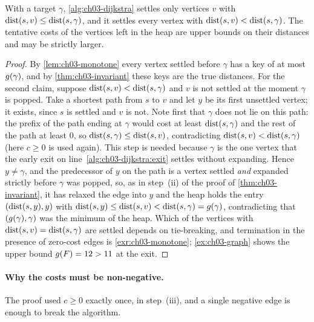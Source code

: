 \begin{corollary}
\label{cor:ch03-ucs}
%
With a target $\gamma$, \cref{alg:ch03-dijkstra} settles only vertices $v$ with
$\operatorname{dist}(s,v)\le\operatorname{dist}(s,\gamma)$, and it settles every vertex with $\operatorname{dist}(s,v)<\operatorname{dist}(s,\gamma)$. The
tentative costs of the vertices left in the heap are upper bounds on their distances and may be
strictly larger.
\end{corollary}
\begin{proof}
By \cref{lem:ch03-monotone} every vertex settled before $\gamma$ has a key of at most $g(\gamma)$,
and by \cref{thm:ch03-invariant} these keys are the true distances. For the second claim,
suppose $\operatorname{dist}(s,v)<\operatorname{dist}(s,\gamma)$ and $v$ is not settled at the moment $\gamma$ is popped. Take a
shortest path from $s$ to $v$ and let $y$ be its first unsettled vertex; it exists, since $s$ is
settled and $v$ is not. Note first that $\gamma$ does not lie on this path: the prefix of the path
ending at $\gamma$ would cost at least $\operatorname{dist}(s,\gamma)$ and the rest of the path at least $0$, so
$\operatorname{dist}(s,\gamma)\le\operatorname{dist}(s,v)$, contradicting $\operatorname{dist}(s,v)<\operatorname{dist}(s,\gamma)$ (here $c\ge0$ is used
again). This step is needed because $\gamma$ is the one vertex that the early exit on
line~\ref{alg:ch03-dijkstra:exit} settles without expanding. Hence $y\neq \gamma$, and the
predecessor of $y$ on the path is a vertex settled \emph{and} expanded strictly before $\gamma$ was
popped, so, as in step~(ii) of the proof of \cref{thm:ch03-invariant}, it has relaxed the edge
into $y$ and the heap holds the entry $(\operatorname{dist}(s,y),y)$ with $\operatorname{dist}(s,y)\le\operatorname{dist}(s,v)<\operatorname{dist}(s,\gamma)=g(\gamma)$,
contradicting that $(g(\gamma),\gamma)$ was the minimum of the heap. Which of the vertices with
$\operatorname{dist}(s,v)=\operatorname{dist}(s,\gamma)$ are settled depends on tie-breaking, and termination in the presence
of zero-cost edges is \cref{exr:ch03-monotone}; \cref{ex:ch03-graph} shows the upper bound
$g(F)=12>11$ at the exit.
\end{proof}

\paragraph{Why the costs must be non-negative.} The proof used $c\ge0$ exactly once, in
step~(iii), and a single negative edge is enough to break the algorithm.

